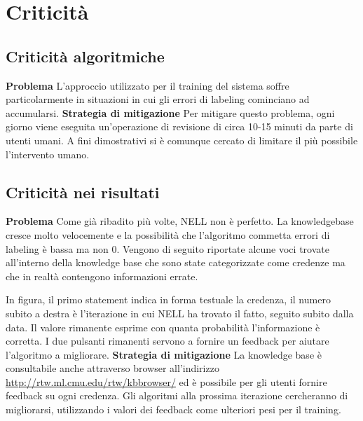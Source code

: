 \section{Criticità}

\subsection{Criticità algoritmiche}
\textbf{Problema}\newline
L'approccio utilizzato per il training del sistema soffre particolarmente in situazioni in cui gli errori di labeling cominciano ad accumularsi.\newline\newline
\textbf{Strategia di mitigazione}\newline
Per mitigare questo problema, ogni giorno viene eseguita un'operazione di revisione di circa 10-15 minuti da parte di utenti umani. A fini dimostrativi si è comunque cercato di limitare il più possibile l'intervento umano\cite{TowardAnArchitecture:online}.

\subsection{Criticità nei risultati}
\textbf{Problema}\newline
Come già ribadito più volte, NELL non è perfetto. La knowledgebase cresce molto velocemente e la possibilità che l'algoritmo commetta errori di labeling è bassa ma non 0. Vengono di seguito riportate alcune voci trovate all'interno della knowledge base che sono state categorizzate come credenze ma che in realtà contengono informazioni errate.

\noindent In figura, il primo statement indica in forma testuale la credenza, il numero subito a destra è l'iterazione in cui NELL ha trovato il fatto, seguito subito dalla data. Il valore rimanente esprime con quanta probabilità l'informazione è corretta. I due pulsanti rimanenti servono a fornire un feedback per aiutare l'algoritmo a migliorare.\newline\newline
\textbf{Strategia di mitigazione}\newline
La knowledge base è consultabile anche attraverso browser all'indirizzo \url{http://rtw.ml.cmu.edu/rtw/kbbrowser/} ed è possibile per gli utenti fornire feedback su ogni credenza. Gli algoritmi alla prossima iterazione cercheranno di migliorarsi, utilizzando i valori dei feedback come ulteriori pesi per il training.
\newpage